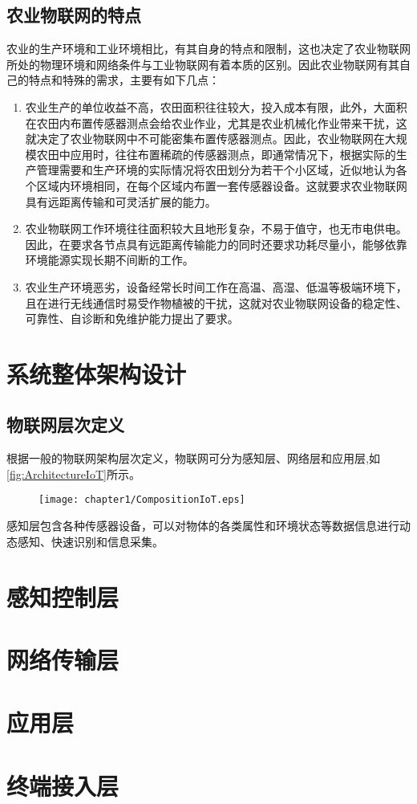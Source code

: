 	\subsection{农业物联网的特点}
	农业的生产环境和工业环境相比，有其自身的特点和限制，这也决定了农业物联网所处的物理环境和网络条件与工业物联网有着本质的区别。因此农业物联网有其自己的特点和特殊的需求，主要有如下几点：
	\begin{enumerate}
  			\item 农业生产的单位收益不高，农田面积往往较大，投入成本有限，此外，大面积在农田内布置传感器测点会给农业作业，尤其是农业机械化作业带来干扰，这就决定了农业物联网中不可能密集布置传感器测点。因此，农业物联网在大规模农田中应用时，往往布置稀疏的传感器测点，即通常情况下，根据实际的生产管理需要和生产环境的实际情况将农田划分为若干个小区域，近似地认为各个区域内环境相同，在每个区域内布置一套传感器设备。这就要求农业物联网具有远距离传输和可灵活扩展的能力。
  			\item 农业物联网工作环境往往面积较大且地形复杂，不易于值守，也无市电供电。因此，在要求各节点具有远距离传输能力的同时还要求功耗尽量小，能够依靠环境能源实现长期不间断的工作。
  			\item 农业生产环境恶劣，设备经常长时间工作在高温、高湿、低温等极端环境下，且在进行无线通信时易受作物植被的干扰，这就对农业物联网设备的稳定性、可靠性、自诊断和免维护能力提出了要求。
	\end{enumerate}

\section{系统整体架构设计}
	\subsection{物联网层次定义}
	根据一般的物联网架构层次定义\supercite{Yu2011Research,LiuQiang2010}，物联网可分为感知层、网络层和应用层,如\ref{fig:ArchitectureIoT}所示。
	\begin{figure}[!htp]
  		\centering
 		\texttt{[image: chapter1/CompositionIoT.eps]}
	\end{figure}
	感知层包含各种传感器设备，可以对物体的各类属性和环境状态等数据信息进行动态感知、快速识别和信息采集。
\section{感知控制层}

\section{网络传输层}

\section{应用层}

\section{终端接入层}
 
